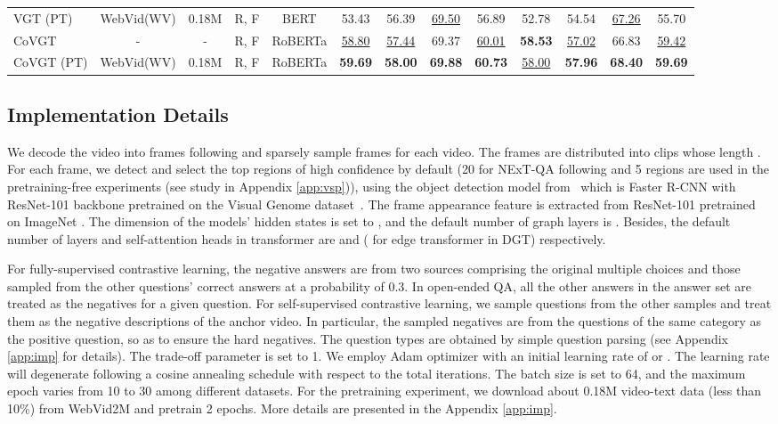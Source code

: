 \documentclass[10pt,journal,compsoc]{IEEEtran}
\begin{document}
\begin{table*}[t]
{\begin{tabular}{l|cc|c|c|ccc|c|ccc|c}
    VGT (PT)  & WebVid(WV) & 0.18M &R, F &BERT & 53.43 & 56.39 & \underline{69.50} & 56.89 & 52.78 & 54.54 & \underline{67.26} & 55.70 \\
    CoVGT & - & - &R, F &RoBERTa & \underline{58.80} & \underline{57.44} & 69.37 & \underline{60.01} & {\bf58.53} & \underline{57.02} & 66.83 & \underline{59.42} \\
    CoVGT (PT) & WebVid(WV) & 0.18M &R, F &RoBERTa & {\bf59.69} & {\bf58.00} & {\bf69.88} & {\bf60.73} & \underline{58.00} & {\bf57.96} & {\bf68.40} & {\bf59.69} \\
    \hline
    \end{tabular}
    }
    \label{tab:resnextqa}
    \vspace{-0.5em}
\end{table*}
\subsection{Implementation Details}
We decode the video into frames following \cite{xiao2021video} and sparsely sample  frames for each video. The frames are distributed into  clips whose length . For each frame, we detect and select the top  regions of high confidence by default (20 for NExT-QA following \cite{xiao2021video} and 5 regions are used in the pretraining-free experiments (see study in Appendix \ref{app:vsp})), using the object detection model from~\cite{anderson2018bottom} which is Faster R-CNN with ResNet-101 backbone pretrained on the Visual Genome dataset~\cite{krishna2017visual}. The frame appearance feature  is extracted from ResNet-101 pretrained on ImageNet \cite{russakovsky2015imagenet}. The dimension of the models' hidden states is set to , and the default number of graph layers is . Besides, the default number of layers and self-attention heads in transformer are  and  ( for edge transformer in DGT) respectively.

For fully-supervised contrastive learning, the negative answers are from two sources comprising the original multiple choices and those sampled from the other questions' correct answers at a probability of 0.3. In open-ended QA, all the other answers in the answer set are treated as the negatives for a given question. For self-supervised contrastive learning, we sample questions from the other samples and treat them as the negative descriptions of the anchor video. In particular, the sampled negatives are from the questions of the same category as the positive question, so as to ensure the hard negatives. The question types are obtained by simple question parsing (see Appendix \ref{app:imp} for details). The trade-off parameter  is set to 1.
We employ Adam \cite{kingma2014adam} optimizer with an initial learning rate of  or . The learning rate will degenerate following a cosine annealing schedule with respect to the total iterations. The batch size is set to 64, and the maximum epoch varies from 10 to 30 among different datasets. For the pretraining experiment, we download about 0.18M video-text data (less than 10\%) from WebVid2M
\cite{bain2021frozen} and pretrain 2 epochs. More details are presented in the Appendix \ref{app:imp}.
\end{document}
